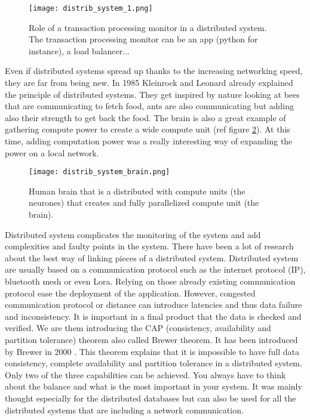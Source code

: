 \begin{figure}[h!]
    \centering
    \texttt{[image: distrib\_system\_1.png]}
    \caption{Role of a transaction processing monitor in a distributed system. The transaction processing monitor can be an app (python for instance), a load balancer...}
    \vspace{0.1cm}
    \label{fig:distrib_system_1}
\end{figure}


Even if distributed systems spread up thanks to the increasing networking speed, they are far from being new. In 1985 Kleinrock and Leonard \cite{kleinrockDistributedSystems} already explained the principle of distributed systems. They get inspired by nature looking at bees that are communicating to fetch food, ants are also communicating but adding also their strength to get back the food. The brain is also a great example of gathering compute power to create a wide compute unit (ref figure \ref{fig:distrib_system_brain}).
At this time, adding computation power was a really interesting way of expanding the power on a local network.

\begin{figure}[h!]
    \centering
    \texttt{[image: distrib\_system\_brain.png]}
    \caption{Human brain that is a distributed with compute units (the neurones) that creates and fully parallelized compute unit (the brain).}
    \vspace{0.1cm}
    \label{fig:distrib_system_brain}
\end{figure}



Distributed system complicates the monitoring of the system and add complexities and faulty points in the system. There have been a lot of
research about the best way of linking pieces of a distributed system. Distributed system are usually based on a communication protocol such as the internet protocol (IP), bluetooth mesh or even Lora.
Relying on those already existing communication protocol ease the deployment of the application.
However, congested communication protocol or distance can introduce latencies and thus data failure and inconsistency.
It is important in a final product that the data is checked and verified.
We are them introducing the CAP (consistency, availability and partition tolerance) theorem also called Brewer theorem.
It has been introduced by Brewer in 2000 \cite{brewerRobustDistributedSystems2000}.
This theorem explains that it is impossible to have full data consistency, complete availability and partition tolerance
in a distributed system. Only two of the three capabilities can be achieved.
You always have to think about the balance and what is the most important in your system.
It was mainly thought especially for the distributed databases but can also be used for all the distributed systems that are
including a network communication.

